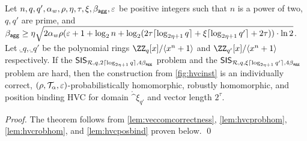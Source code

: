 \begin{theorem}\label{theo:veccom}
  Let $n,q,q',\alpha_w,\rho,\eta,\tau,\xi,\beta_{\mathsf{agg}},\varepsilon$ be positive integers such that $n$ is a power of two, $q,q'$ are prime, and 
$\beta_{\mathsf{agg}} \geq \eta\sqrt{2\alpha_w\rho(\varepsilon+1+\log_2 n + \log_2(2\tau \lceil\log_{2\eta+1}q\rceil + \xi\lceil\log_{2\eta+1}q'\rceil + 2\tau))\cdot\ln2}$. 
  Let $\ring_q,\ring_{q'}$ be the polynomial rings $\ZZ_q[x]/\langle x^n+1\rangle$ and $\ZZ_{q'}[x]/\langle x^n+1\rangle$ respectively.
  If the $\mathsf{SIS}_{\mathcal{R},q,2\lceil \log_{2\eta+1} q \rceil,4\beta_{\mathsf{agg}}}$ problem and the $\mathsf{SIS}_{\mathcal{R},q,\xi\lceil \log_{2\eta+1} q' \rceil,4\beta_{\mathsf{agg}}}$ problem are hard, then the construction from \autoref{fig:hvcinst} is an individually correct, $(\rho,\mathcal{T}_\alpha,\varepsilon)$-probabilistically homomorphic, robustly homomorphic, and position binding HVC for domain $\ring^{\xi}_{q'}$ and vector length $2^\tau$.
\end{theorem}
\begin{proof}
  The theorem follows from \autoref{lem:veccomcorrectness}, \autoref{lem:hvcprobhom}, \autoref{lem:hvcrobhom}, and \autoref{lem:hvcposbind} proven below. \qed
\end{proof}

